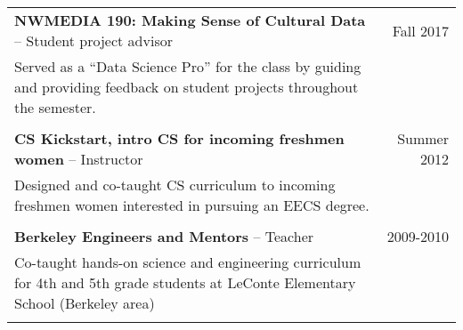 \begin{longtable}{Xr}
	\textbf{NWMEDIA 190: Making Sense of Cultural Data} -- Student project advisor & Fall 2017 \\
	Served as a “Data Science Pro” for the class by guiding and providing feedback on student projects throughout the semester. &  \\
	\\

	\textbf{CS Kickstart, intro CS for incoming freshmen women} -- Instructor & Summer 2012 \\
	Designed and co-taught CS curriculum to incoming freshmen women interested in pursuing an EECS degree. &  \\
	\\

	\textbf{Berkeley Engineers and Mentors} -- Teacher & 2009-2010 \\
	Co-taught hands-on science and engineering curriculum for 4th and 5th grade students at LeConte Elementary School (Berkeley area) &  \\
	\\

\end{longtable}